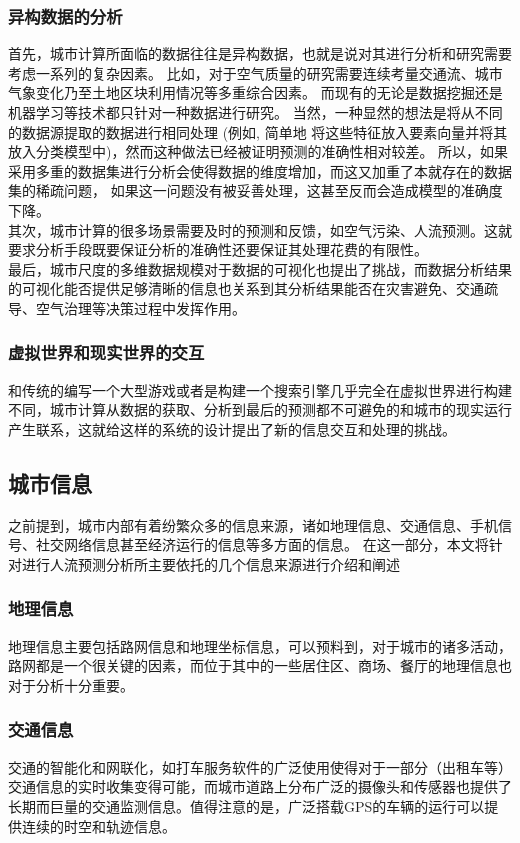\subsubsection*{异构数据的分析}
首先，城市计算所面临的数据往往是异构数据，也就是说对其进行分析和研究需要考虑一系列的复杂因素。 比如，对于空气质量的研究需要连续考量交通流、城市气象变化乃至土地区块利用情况等多重综合因素。 而现有的无论是数据挖掘还是机器学习等技术都只针对一种数据进行研究。 当然，一种显然的想法是将从不同的数据源提取的数据进行相同处理 (例如, 简单地
将这些特征放入要素向量并将其放入分类模型中)，然而这种做法已经被证明预测的准确性相对较差\cite{yuan2012discovering}。 所以，如果采用多重的数据集进行分析会使得数据的维度增加，而这又加重了本就存在的数据集的稀疏问题， 如果这一问题没有被妥善处理，这甚至反而会造成模型的准确度下降。 \\
其次，城市计算的很多场景需要及时的预测和反馈，如空气污染、人流预测。这就要求分析手段既要保证分析的准确性还要保证其处理花费的有限性。
\\
最后，城市尺度的多维数据规模对于数据的可视化也提出了挑战，而数据分析结果的可视化能否提供足够清晰的信息也关系到其分析结果能否在灾害避免、交通疏导、空气治理等决策过程中发挥作用。
\subsubsection*{虚拟世界和现实世界的交互}
和传统的编写一个大型游戏或者是构建一个搜索引擎几乎完全在虚拟世界进行构建不同，城市计算从数据的获取、分析到最后的预测都不可避免的和城市的现实运行产生联系，这就给这样的系统的设计提出了新的信息交互和处理的挑战。
\subsection{城市信息}
之前提到，城市内部有着纷繁众多的信息来源，诸如地理信息、交通信息、手机信号、社交网络信息甚至经济运行的信息等多方面的信息。 在这一部分，本文将针对进行人流预测分析所主要依托的几个信息来源进行介绍和阐述
\subsubsection*{地理信息}
地理信息主要包括路网信息和地理坐标信息，可以预料到，对于城市的诸多活动，路网都是一个很关键的因素，而位于其中的一些居住区、商场、餐厅的地理信息也对于分析十分重要。
\subsubsection*{交通信息}
交通的智能化和网联化，如打车服务软件的广泛使用使得对于一部分（出租车等）交通信息的实时收集变得可能，而城市道路上分布广泛的摄像头和传感器也提供了长期而巨量的交通监测信息。值得注意的是，广泛搭载GPS的车辆的运行可以提供连续的时空和轨迹信息。
